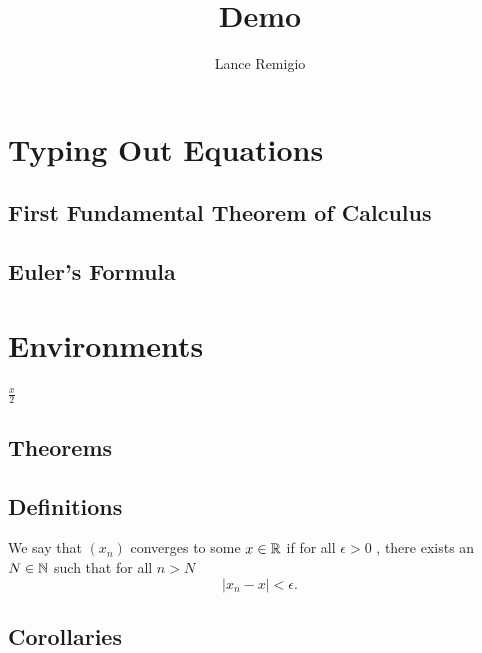 \documentclass[a4paper]{article}
\title{Demo}
\author{Lance Remigio}
\begin{document}
\maketitle

\section{Typing Out Equations}

\subsection{First Fundamental Theorem of Calculus}

\subsection{Euler's Formula}



\section{Environments}
\( \frac{ x }{ 2 }  \)



\subsection{Theorems}

\subsection{Definitions}

\begin{definition}
   We say that \( ({x}_{n}) \) converges to some \( x \in \mathbb{R}  \) if for all \( \epsilon > 0  \) , there exists an \(N \in \mathbb{N}  \) such that for all \( n > N  \) 
   \[  | {x}_{n} - x  |  < \epsilon. \]
\end{definition}


\subsection{Corollaries}
\end{document}
